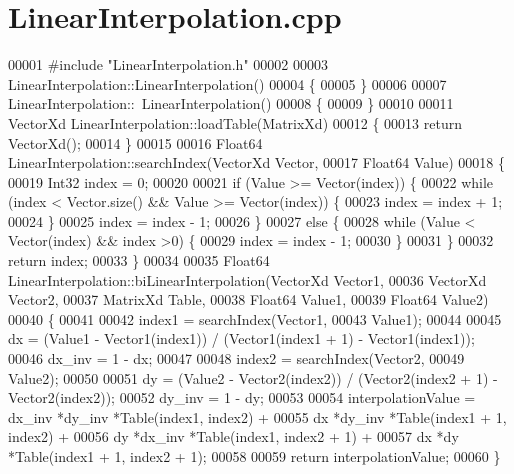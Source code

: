 \hypertarget{_linear_interpolation_8cpp_source}{}\section{Linear\+Interpolation.\+cpp}
\label{_linear_interpolation_8cpp_source}

\begin{DoxyCode}
00001 \textcolor{preprocessor}{#include "LinearInterpolation.h"}
00002 
00003 LinearInterpolation::LinearInterpolation()
00004 \{
00005 \}
00006 
00007 LinearInterpolation::~LinearInterpolation()
00008 \{
00009 \}
00010 
00011 VectorXd LinearInterpolation::loadTable(MatrixXd)
00012 \{
00013     \textcolor{keywordflow}{return} VectorXd();
00014 \}
00015 
00016 Float64 LinearInterpolation::searchIndex(VectorXd Vector,
00017                                          Float64 Value)
00018 \{
00019     Int32 index = 0;
00020 
00021     \textcolor{keywordflow}{if} (Value >= Vector(index)) \{
00022         \textcolor{keywordflow}{while} (index < Vector.size() && Value >= Vector(index)) \{
00023             index = index + 1;
00024         \}
00025         index = index - 1;
00026     \}
00027     \textcolor{keywordflow}{else} \{
00028         \textcolor{keywordflow}{while} (Value < Vector(index) && index >0) \{
00029             index = index - 1;
00030         \}
00031     \}
00032     \textcolor{keywordflow}{return} index;
00033 \}
00034 
00035 Float64 LinearInterpolation::biLinearInterpolation(VectorXd Vector1,
00036                                                    VectorXd Vector2,
00037                                                    MatrixXd Table,
00038                                                    Float64 Value1,
00039                                                    Float64 Value2)
00040 \{
00041 
00042     index1 = searchIndex(Vector1,
00043                          Value1);
00044 
00045     dx = (Value1 - Vector1(index1)) / (Vector1(index1 + 1) - Vector1(index1));
00046     dx\_inv = 1 - dx;
00047 
00048     index2 = searchIndex(Vector2,
00049         Value2);
00050 
00051     dy = (Value2 - Vector2(index2)) / (Vector2(index2 + 1) - Vector2(index2));
00052     dy\_inv = 1 - dy;
00053 
00054     interpolationValue =    dx\_inv  *dy\_inv *Table(index1, index2) +
00055                             dx      *dy\_inv *Table(index1 + 1, index2) +
00056                             dy      *dx\_inv *Table(index1, index2 + 1) +
00057                             dx      *dy     *Table(index1 + 1, index2 + 1);
00058 
00059     \textcolor{keywordflow}{return} interpolationValue;
00060 \}
\end{DoxyCode}
